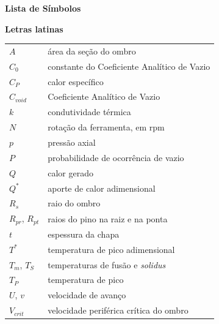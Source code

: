 \documentclass[12pt,openany]{report}
\begin{document}
\begin{center}
    {\fontsize{18}{22}\selectfont\bfseries Lista de Símbolos\par}
\end{center}
\vspace{1cm}
\begin{singlespace}
\noindent\textbf{Letras latinas}\\[4pt]
\begin{tabular}{@{}p{2.2cm}p{12.5cm}@{}}
$A$ & área da seção do ombro \\
$C_0$ & constante do Coeficiente Analítico de Vazio \\
$C_P$ & calor específico \\
$C_{void}$ & Coeficiente Analítico de Vazio \\
$k$ & condutividade térmica \\
$N$ & rotação da ferramenta, em rpm \\
$p$ & pressão axial \\
$P$ & probabilidade de ocorrência de vazio \\
$Q$ & calor gerado \\
$Q^{*}$ & aporte de calor adimensional \\
$R_s$ & raio do ombro \\
$R_{pr}$, $R_{pt}$ & raios do pino na raiz e na ponta \\
$t$ & espessura da chapa \\
$T^{*}$ & temperatura de pico adimensional \\
$T_m$, $T_S$ & temperaturas de fusão e \textit{solidus} \\
$T_P$ & temperatura de pico \\
$U$, $v$ & velocidade de avanço \\
$V_{crit}$ & velocidade periférica crítica do ombro \\
\end{tabular}


\end{singlespace}
\end{document}
